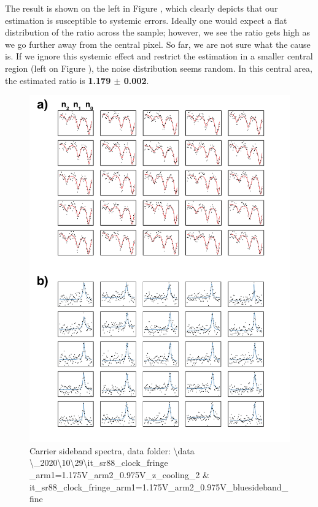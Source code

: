 \documentclass[bibnotes]{article}
\begin{document}
		 The result is shown on the left in Figure \label{fig:pol_ratio}, which clearly depicts that our estimation is susceptible to systemic errors. Ideally one would expect a flat distribution of the ratio across the sample; however, we see the ratio gets high as we go further away from the central pixel. So far, we are not sure what the cause is. If we ignore this systemic effect and restrict the estimation in a smaller central region (left on Figure \label{fig:pol_ratio}), the noise distribution seems random. In this central area, the estimated ratio is \textbf{1.179 $\pmb{\pm}$ 0.002}. 

		\begin{figure}
		    \centering
		    \includegraphics[scale=0.8]{figures/carrier_sideband_spectra.pdf}
		    \caption{Carrier sideband spectra, data folder: \textbackslash data \textbackslash\_2020\textbackslash10\textbackslash29\textbackslash it\_sr88\_clock\_fringe\\ \_arm1=1.175V\_arm2\_0.975V\_z\_cooling\_2 \& it\_sr88\_clock\_fringe\_arm1=1.175V\_arm2\_0.975V\_bluesideband\_fine}
		    \label{fig:carrier_sideband_spectra}
		\end{figure}
\end{document}
